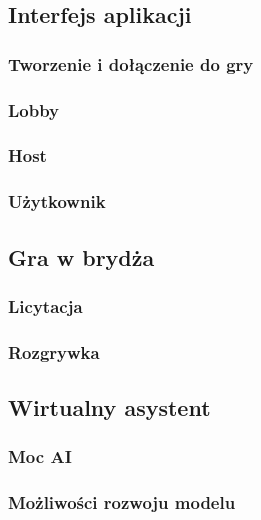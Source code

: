 \subsection{Interfejs aplikacji}

\subsubsection{Tworzenie i dołączenie do gry}
\subsubsection{Lobby}
\subsubsection{Host}
\subsubsection{Użytkownik}


\subsection{Gra w brydża}

\subsubsection{Licytacja}
\subsubsection{Rozgrywka}


\subsection{Wirtualny asystent}

\subsubsection{Moc AI}
\label{subsubsec:mocai}

\subsubsection{Możliwości rozwoju modelu}

